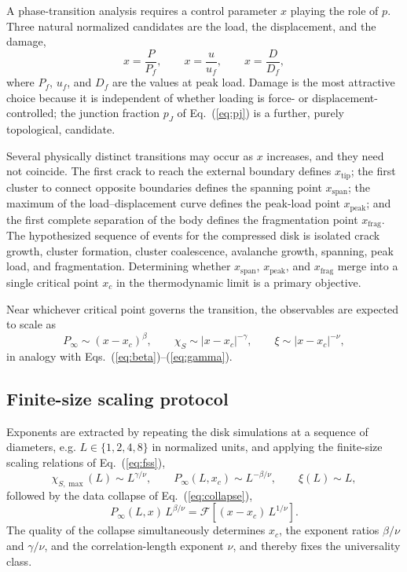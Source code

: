 \documentclass[preprint,12pt]{elsarticle}
\begin{document}
A phase-transition analysis requires a control parameter $x$ playing the role of $p$.
Three natural normalized candidates are the load, the displacement, and the damage,
\begin{equation}
x = \frac{P}{P_f}, \qquad x = \frac{u}{u_f}, \qquad x = \frac{D}{D_f},
\label{eq:control}
\end{equation}
where $P_f$, $u_f$, and $D_f$ are the values at peak load. Damage is the most
attractive choice because it is independent of whether loading is force- or
displacement-controlled; the junction fraction $p_J$ of Eq.~(\ref{eq:pj}) is a further,
purely topological, candidate.

Several physically distinct transitions may occur as $x$ increases, and they need not
coincide. The first crack to reach the external boundary defines $x_{\mathrm{tip}}$;
the first cluster to connect opposite boundaries defines the spanning point
$x_{\mathrm{span}}$; the maximum of the load--displacement curve defines the peak-load
point $x_{\mathrm{peak}}$; and the first complete separation of the body defines the
fragmentation point $x_{\mathrm{frag}}$. The hypothesized sequence of events for the
compressed disk is isolated crack growth, cluster formation, cluster coalescence,
avalanche growth, spanning, peak load, and fragmentation. Determining whether
$x_{\mathrm{span}}$, $x_{\mathrm{peak}}$, and $x_{\mathrm{frag}}$ merge into a single
critical point $x_c$ in the thermodynamic limit is a primary objective.

Near whichever critical point governs the transition, the observables are expected to
scale as
\begin{equation}
P_\infty \sim (x-x_c)^{\beta}, \qquad
\chi_S \sim |x-x_c|^{-\gamma}, \qquad
\xi \sim |x-x_c|^{-\nu},
\label{eq:vcem-scaling}
\end{equation}
in analogy with Eqs.~(\ref{eq:beta})--(\ref{eq:gamma}).

\subsection{Finite-size scaling protocol}
\label{sec:vcem-fss}

Exponents are extracted by repeating the disk simulations at a sequence of diameters,
e.g. $L \in \{1,2,4,8\}$ in normalized units, and applying the finite-size scaling
relations of Eq.~(\ref{eq:fss}),
\begin{equation}
\chi_{S,\max}(L)\sim L^{\gamma/\nu}, \qquad
P_\infty(L,x_c)\sim L^{-\beta/\nu}, \qquad
\xi(L)\sim L,
\end{equation}
followed by the data collapse of Eq.~(\ref{eq:collapse}),
\begin{equation}
P_\infty(L,x)\,L^{\beta/\nu} = \mathcal{F}\!\left[(x-x_c)\,L^{1/\nu}\right].
\label{eq:vcem-collapse}
\end{equation}
The quality of the collapse simultaneously determines $x_c$, the exponent ratios
$\beta/\nu$ and $\gamma/\nu$, and the correlation-length exponent $\nu$, and thereby
fixes the universality class.
\end{document}
